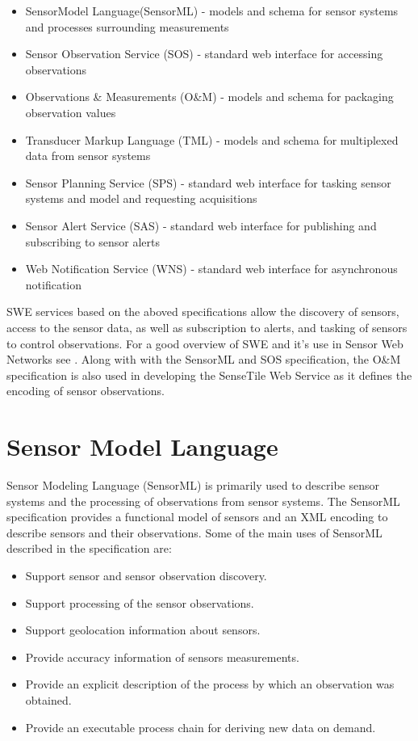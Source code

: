 \documentclass[]{final_report}
\begin{document}
\begin{itemize}
\item  SensorModel Language(SensorML) - models and schema for sensor systems and processes surrounding measurements
\item  Sensor Observation Service (SOS) - standard web interface for accessing observations
\item  Observations \& Measurements (O\&M) - models and schema for packaging observation values
\item  Transducer Markup Language (TML) - models and schema for multiplexed data from sensor systems
\item  Sensor Planning Service (SPS) - standard web interface for tasking sensor systems and model and requesting acquisitions
\item  Sensor Alert Service (SAS) - standard web interface for publishing and subscribing to sensor alerts
\item  Web Notification Service (WNS) - standard web interface for asynchronous notification
\end{itemize}

SWE services based on the aboved specifications allow the discovery of sensors, access to the sensor data, as well as subscription to alerts, and tasking of sensors to control observations. For a good overview of SWE and it's use in Sensor Web Networks see \cite{SWEArchref}.  Along with with the SensorML and SOS specification, the O\&M specification is also used in developing the SenseTile Web Service as it defines the encoding of sensor observations. 


\section{Sensor Model Language}\label{SMLsection}
Sensor Modeling Language (SensorML) is primarily used to describe sensor systems and the processing of observations from sensor systems. The SensorML specification\cite{SMLref} provides a functional model of sensors and an XML encoding to describe sensors and their observations. Some of the main uses of SensorML described in the specification are:
\begin{itemize}
\item Support sensor and sensor observation discovery.
\item Support processing of the sensor observations.
\item Support geolocation information about sensors.
\item Provide accuracy information of sensors measurements.
\item Provide an explicit description of the process by which an observation was obtained.
\item Provide an executable process chain for deriving new data on demand.
\end{itemize}
\end{document}
